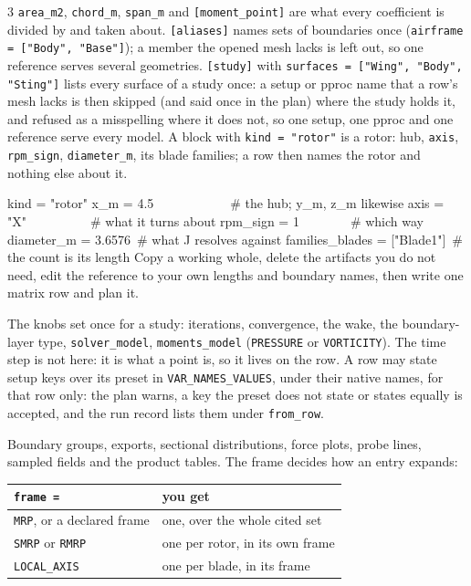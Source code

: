 \begin{multicols}{3}
\texttt{area\_m2}, \texttt{chord\_m}, \texttt{span\_m} and \texttt{[moment\_point]} are what every coefficient is divided by and taken about. \texttt{[aliases]} names sets of boundaries once (\texttt{airframe = ["Body", "Base"]}); a member the opened mesh lacks is left out, so one reference serves several geometries. \texttt{[study]} with \texttt{surfaces = ["Wing", "Body", "Sting"]} lists every surface of a study once: a setup or pproc name that a row's mesh lacks is then skipped (and said once in the plan) where the study holds it, and refused as a misspelling where it does not, so one setup, one pproc and one reference serve every model. A block with \texttt{kind = "rotor"} is a rotor: hub, \texttt{axis}, \texttt{rpm\_sign}, \texttt{diameter\_m}, its blade families; a row then names the rotor and nothing else about it.

{\ttfamily\scriptsize\obeylines\obeyspaces%
[PORT]
kind = "rotor"
x\_m = 4.5\ \ \ \ \ \ \ \ \ \ \ \ \# the hub; y\_m, z\_m likewise
axis = "X"\ \ \ \ \ \ \ \ \ \ \# what it turns about
rpm\_sign = 1\ \ \ \ \ \ \ \ \# which way
diameter\_m = 3.6576\ \# what J resolves against
families\_blades = ["Blade1"]\ \# the count is its length
}
Copy a working  whole, delete the artifacts you do not need, edit the reference to your own lengths and boundary names, then write one matrix row and plan it.

\columnbreak
{}
The knobs set once for a study: iterations, convergence, the wake, the boundary-layer type, \texttt{solver\_model}, \texttt{moments\_model} (\texttt{PRESSURE} or \texttt{VORTICITY}). The time step is not here: it is what a point is, so it lives on the row. A row may state setup keys over its preset in \texttt{VAR\_NAMES\_VALUES}, under their native names, for that row only: the plan warns, a key the preset does not state or states equally is accepted, and the run record lists them under \texttt{from\_row}.

Boundary groups, exports, sectional distributions, force plots, probe lines, sampled fields and the product tables. The frame decides how an entry expands:

\begin{tabular}{@{}l@{\ \ }l@{}}
\texttt{frame =} & you get \\\hline
\texttt{MRP}, or a declared frame & one, over the whole cited set \\
\texttt{SMRP} or \texttt{RMRP} & one per rotor, in its own frame \\
\texttt{LOCAL\_AXIS} & one per blade, in its frame \\
\end{tabular}


\end{multicols}
